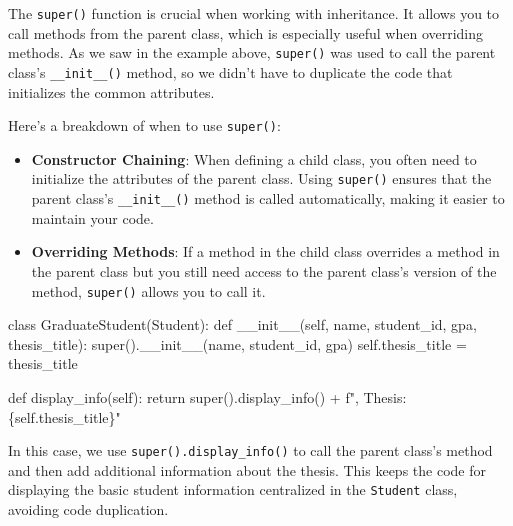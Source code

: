 \documentclass[
  letterpaper,
  DIV=11,
  numbers=noendperiod]{scrreprt}
\newenvironment{Shaded}{\begin{snugshade}}{\end{snugshade}}
\newcommand{\BuiltInTok}[1]{\textcolor[rgb]{0.00,0.23,0.31}{#1}}
\newcommand{\ControlFlowTok}[1]{\textcolor[rgb]{0.00,0.23,0.31}{#1}}
\newcommand{\FunctionTok}[1]{\textcolor[rgb]{0.28,0.35,0.67}{#1}}
\newcommand{\KeywordTok}[1]{\textcolor[rgb]{0.00,0.23,0.31}{#1}}
\newcommand{\NormalTok}[1]{\textcolor[rgb]{0.00,0.23,0.31}{#1}}
\newcommand{\OperatorTok}[1]{\textcolor[rgb]{0.37,0.37,0.37}{#1}}
\newcommand{\SpecialCharTok}[1]{\textcolor[rgb]{0.37,0.37,0.37}{#1}}
\newcommand{\SpecialStringTok}[1]{\textcolor[rgb]{0.13,0.47,0.30}{#1}}
\newcommand{\VariableTok}[1]{\textcolor[rgb]{0.07,0.07,0.07}{#1}}
\providecommand{\tightlist}{%
  \setlength{\itemsep}{0pt}\setlength{\parskip}{0pt}}\usepackage{longtable,booktabs,array}
\begin{document}
The \texttt{super()} function is crucial when working with inheritance.
It allows you to call methods from the parent class, which is especially
useful when overriding methods. As we saw in the example above,
\texttt{super()} was used to call the parent class's
\texttt{\_\_init\_\_()} method, so we didn't have to duplicate the code
that initializes the common attributes.

Here's a breakdown of when to use \texttt{super()}:

\begin{itemize}
\tightlist
\item
  \textbf{Constructor Chaining}: When defining a child class, you often
  need to initialize the attributes of the parent class. Using
  \texttt{super()} ensures that the parent class's
  \texttt{\_\_init\_\_()} method is called automatically, making it
  easier to maintain your code.
\item
  \textbf{Overriding Methods}: If a method in the child class overrides
  a method in the parent class but you still need access to the parent
  class's version of the method, \texttt{super()} allows you to call it.
\end{itemize}

\begin{Shaded}
\begin{Highlighting}[]
\KeywordTok{class}\NormalTok{ GraduateStudent(Student):}
    \KeywordTok{def} \FunctionTok{\_\_init\_\_}\NormalTok{(}\VariableTok{self}\NormalTok{, name, student\_id, gpa, thesis\_title):}
        \BuiltInTok{super}\NormalTok{().}\FunctionTok{\_\_init\_\_}\NormalTok{(name, student\_id, gpa)}
        \VariableTok{self}\NormalTok{.thesis\_title }\OperatorTok{=}\NormalTok{ thesis\_title}

    \KeywordTok{def}\NormalTok{ display\_info(}\VariableTok{self}\NormalTok{):}
        \ControlFlowTok{return} \BuiltInTok{super}\NormalTok{().display\_info() }\OperatorTok{+} \SpecialStringTok{f", Thesis: }\SpecialCharTok{\{}\VariableTok{self}\SpecialCharTok{.}\NormalTok{thesis\_title}\SpecialCharTok{\}}\SpecialStringTok{"}
\end{Highlighting}
\end{Shaded}

In this case, we use \texttt{super().display\_info()} to call the parent
class's method and then add additional information about the thesis.
This keeps the code for displaying the basic student information
centralized in the \texttt{Student} class, avoiding code duplication.
\end{document}
